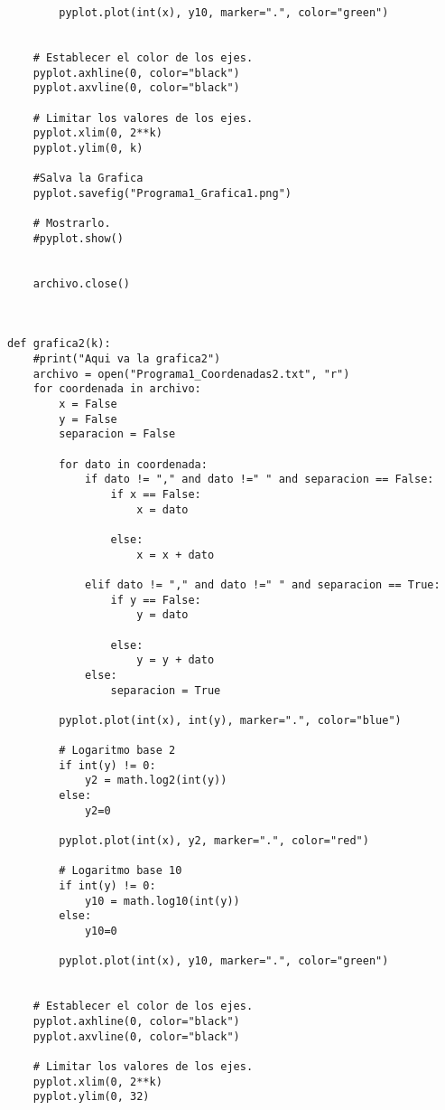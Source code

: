 \documentclass{article}
\begin{document}
\begin{flushleft}
\begin{lstlisting}
        pyplot.plot(int(x), y10, marker=".", color="green")
                
                
    # Establecer el color de los ejes.
    pyplot.axhline(0, color="black")
    pyplot.axvline(0, color="black")
    
    # Limitar los valores de los ejes.
    pyplot.xlim(0, 2**k)
    pyplot.ylim(0, k)
    
    #Salva la Grafica
    pyplot.savefig("Programa1_Grafica1.png")
    
    # Mostrarlo.
    #pyplot.show()

            
    archivo.close()
    
    
    
def grafica2(k):
    #print("Aqui va la grafica2")
    archivo = open("Programa1_Coordenadas2.txt", "r")
    for coordenada in archivo:
        x = False
        y = False
        separacion = False
        
        for dato in coordenada:
            if dato != "," and dato !=" " and separacion == False:
                if x == False:
                    x = dato
                
                else:
                    x = x + dato
            
            elif dato != "," and dato !=" " and separacion == True:
                if y == False:
                    y = dato
                
                else:
                    y = y + dato
            else:
                separacion = True
                
        pyplot.plot(int(x), int(y), marker=".", color="blue")
        
        # Logaritmo base 2
        if int(y) != 0:
            y2 = math.log2(int(y))
        else:
            y2=0
            
        pyplot.plot(int(x), y2, marker=".", color="red")

        # Logaritmo base 10
        if int(y) != 0:
            y10 = math.log10(int(y))
        else:
            y10=0
            
        pyplot.plot(int(x), y10, marker=".", color="green")
                
    
    # Establecer el color de los ejes.
    pyplot.axhline(0, color="black")
    pyplot.axvline(0, color="black")
    
    # Limitar los valores de los ejes.
    pyplot.xlim(0, 2**k)
    pyplot.ylim(0, 32)
    

\end{lstlisting}
\end{flushleft}
\end{document}
